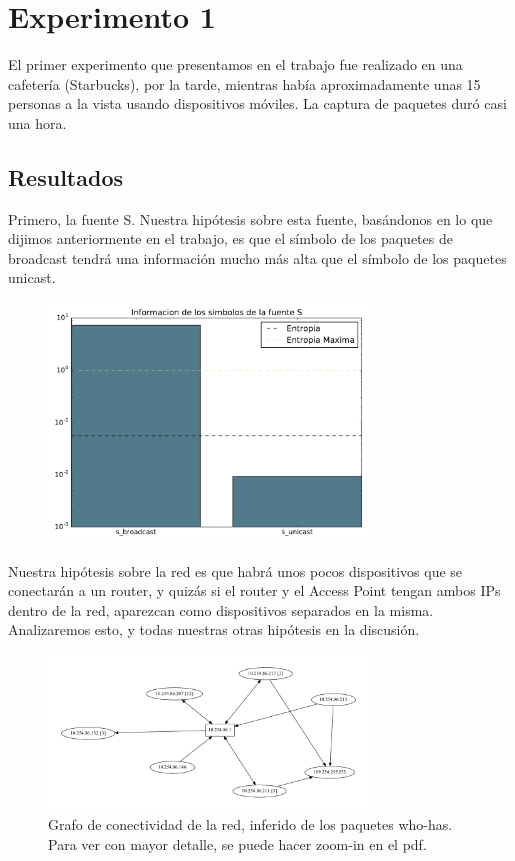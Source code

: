 \section{Experimento 1}

El primer experimento que presentamos en el trabajo fue realizado en una cafetería (Starbucks), por la tarde, mientras había aproximadamente unas 15 personas a la vista usando dispositivos móviles. La captura de paquetes duró casi una hora.

\subsection{Resultados}

Primero, la fuente S. Nuestra hipótesis sobre esta fuente, basándonos en lo que dijimos anteriormente en el trabajo, es que el símbolo de los paquetes de broadcast tendrá una información mucho más alta que el símbolo de los paquetes unicast.

\begin{figure}[H]
  \centering
  \includegraphics[width=8.5cm]{exp_starbucks/grafico1.pdf}
  \caption{\normalfont }
\end{figure}

Nuestra hipótesis sobre la red es que habrá unos pocos dispositivos que se conectarán a un router, y quizás si el router y el Access Point tengan ambos IPs dentro de la red, aparezcan como dispositivos separados en la misma.
Analizaremos esto, y todas nuestras otras hipótesis en la discusión.

\begin{figure}[H]
  \centering
  \includegraphics[width=8.5cm]{exp_starbucks/grafico2.pdf}
  \caption{  \normalfont Grafo de conectividad de la red, inferido de los paquetes who-has. Para ver con mayor detalle, se puede hacer zoom-in en el pdf. }
\end{figure}

